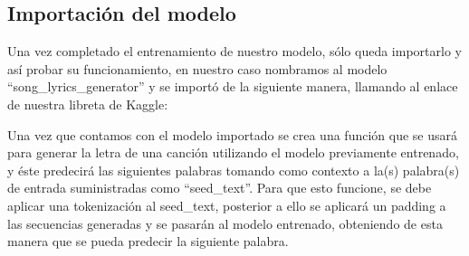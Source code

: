 \documentclass[12pt, a4paper, titlepage]{article}
\begin{document}
	\subsection{Importación del modelo}
	Una vez completado el entrenamiento de nuestro modelo, sólo queda importarlo y así probar su funcionamiento, en nuestro caso nombramos al modelo “song\_lyrics\_generator” y se importó de la siguiente manera, llamando al enlace de nuestra libreta de Kaggle:
	\begin{center}
		
	\end{center}
	Una vez que contamos con el modelo importado se crea una función que se usará para generar la letra de una canción utilizando el modelo previamente entrenado, y éste predecirá las siguientes palabras tomando como contexto a la(s) palabra(s) de entrada suministradas como “seed\_text”. Para que esto funcione, se debe aplicar una tokenización al seed\_text, posterior a ello se aplicará un padding a las secuencias generadas y se pasarán al modelo entrenado, obteniendo de esta manera que se pueda predecir la siguiente palabra.
	\begin{center}
		
	\end{center}	
	\newpage
\end{document}
